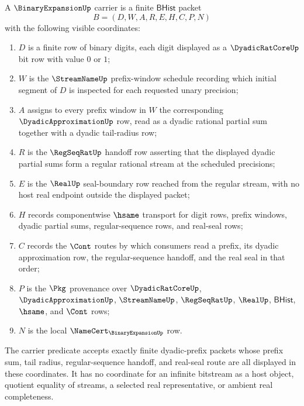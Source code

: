 \begin{definition}
\label{def:binary-expansion-carrier}
A $\BinaryExpansionUp$ carrier is a finite $\mathsf{BHist}$ packet
$$
B=(D,W,A,R,E,H,C,P,N)
$$
with the following visible coordinates:
\begin{enumerate}
\item $D$ is a finite row of binary digits, each digit displayed as a $\DyadicRatCoreUp$ bit row with value $0$ or $1$;
\item $W$ is the $\StreamNameUp$ prefix-window schedule recording which initial segment of $D$ is inspected for each requested unary precision;
\item $A$ assigns to every prefix window in $W$ the corresponding $\DyadicApproximationUp$ row, read as a dyadic rational partial sum together with a dyadic tail-radius row;
\item $R$ is the $\RegSeqRatUp$ handoff row asserting that the displayed dyadic partial sums form a regular rational stream at the scheduled precisions;
\item $E$ is the $\RealUp$ seal-boundary row reached from the regular stream, with no host real endpoint outside the displayed packet;
\item $H$ records componentwise $\hsame$ transport for digit rows, prefix windows, dyadic partial sums, regular-sequence rows, and real-seal rows;
\item $C$ records the $\Cont$ routes by which consumers read a prefix, its dyadic approximation row, the regular-sequence handoff, and the real seal in that order;
\item $P$ is the $\Pkg$ provenance over $\DyadicRatCoreUp$, $\DyadicApproximationUp$, $\StreamNameUp$, $\RegSeqRatUp$, $\RealUp$, $\mathsf{BHist}$, $\hsame$, and $\Cont$ rows;
\item $N$ is the local $\NameCert_{\BinaryExpansionUp}$ row.
\end{enumerate}
The carrier predicate accepts exactly finite dyadic-prefix packets whose prefix sum, tail radius, regular-sequence handoff, and real-seal route are all displayed in these coordinates. It has no coordinate for an infinite bitstream as a host object, quotient equality of streams, a selected real representative, or ambient real completeness.
\end{definition}

